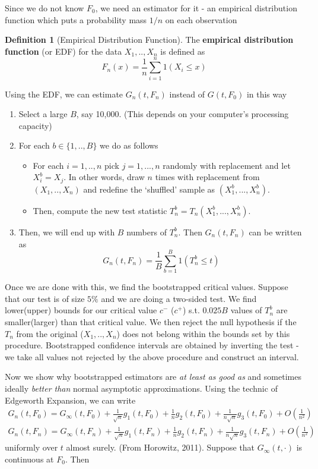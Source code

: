 \documentclass[12pt]{article}
\theoremstyle{definition}
\newtheorem{definition}{Definition}[section]
\theoremstyle{property}
\theoremstyle{assumption}
\theoremstyle{example}
\theoremstyle{comment}
\begin{document}
Since we do not know $F_0$, we need an estimator for it - an empirical distribution function which puts a probability mass $1/n$ on each observation
\begin{mdframed}[backgroundcolor=blue!5] 
\begin{definition}[Empirical Distribution Function] The \textbf{empirical distribution function} (or EDF) for the data $X_1,..,X_n$ is defined as
\[
F_n(x) = \frac{1}{n}\sum_{i=1}^n 1(X_i\leq x)
\]
\end{definition}
\end{mdframed} 
Using the EDF, we can estimate $G_n(t, F_n)$ instead of $G(t,F_0)$ in this way
\begin{enumerate}
\item Select a large $B$, say 10,000. (This depends on your computer's processing capacity)
\item For each $b\in\{1,..,B\}$ we do as follows
\begin{itemize}
\item For each $i=1,..,n$ pick $j=1,...,n$ randomly with replacement and let $X_i^b= X_j$. In other words, draw $n$ times with replacement from $(X_1,..,X_n)$ and redefine the `shuffled' sample as $(X_1^b,...,X_n^b)$. 
\item Then, compute the new test statistic $T_n^b=T_n(X_1^b,...,X_n^b)$. 
\end{itemize}
\item Then, we will end up with $B$ numbers of $T_n^b$. Then $G_n(t,F_n)$ can be written as
\[
G_n(t,F_n) = \frac{1}{B}\sum_{b=1}^B 1(T_n^b\leq t)
\]
\end{enumerate}\par
Once we are done with this, we find the bootstrapped critical values. Suppose that our test is of size $5\%$ and we are doing a two-sided test. We find lower(upper) bounds for our critical value $c^-$ ($c^+$) s.t. $0.025B$ values of $T_n^b$ are smaller(larger) than that critical value. We then reject the null hypothesis if the $T_n$ from the original ($X_1,..,X_n$) does not belong within the bounds set by this procedure. Bootstrapped confidence intervals are obtained by inverting the test - we take all values not rejected by the above procedure and construct an interval. \par
Now we show why bootstrapped estimators are \textit{at least as good as} and sometimes ideally \textit{better than} normal asymptotic approximations. Using the technic of Edgeworth Expansion, we can write
\begin{gather*}
G_n(t,F_0)=G_\infty(t,F_0) +\frac{1}{\sqrt{n}}g_1(t,F_0)+\frac{1}{n}g_2(t,F_0)+\frac{1}{n\sqrt{n}}g_3(t,F_0)+O\left(\frac{1}{n^2}\right)\\
G_n(t,F_n)=G_\infty(t,F_n) +\frac{1}{\sqrt{n}}g_1(t,F_n)+\frac{1}{n}g_2(t,F_n)+\frac{1}{n\sqrt{n}}g_3(t,F_n)+O\left(\frac{1}{n^2}\right)
\end{gather*}uniformly over $t$ almost surely. (From Horowitz, 2011). Suppose that $G_\infty(t,\cdot)$ is continuous at $F_0$. Then
\end{document}
